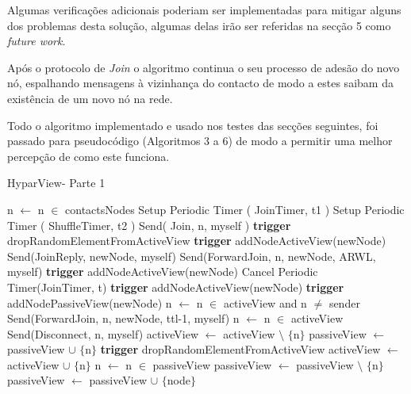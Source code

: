 Algumas verificações adicionais poderiam ser implementadas para mitigar alguns dos problemas desta solução, algumas delas irão ser referidas na secção 5 como \textit{future work}.

Após o protocolo de \textit{Join} o algoritmo continua o seu processo de adesão do novo nó, espalhando mensagens à vizinhança do contacto de modo a estes saibam da existência de um novo nó na rede.

Todo o algoritmo implementado e usado nos testes das secções seguintes, foi passado para pseudocódigo (Algoritmos 3 a 6) de modo a permitir uma melhor percepção de como este funciona.

\begin{algorithm}
   \caption{HyparView- Parte 1}
    \begin{algorithmic}[1]
        \State n $\leftarrow$ n $\in$ contactsNodes
        \State Setup Periodic Timer ( JoinTimer, t1 )
	    \State Setup Periodic Timer ( ShuffleTimer, t2 )
	    \State Send( Join, n, myself )
	  \EndFunction
	    \State
            \State \textbf{trigger} dropRandomElementFromActiveView
        \EndIf
        \State \textbf{trigger} addNodeActiveView(newNode)
        \State Send(JoinReply, newNode, myself)
            \State Send(ForwardJoin, n, newNode, ARWL, myself)
        \EndFor
     \EndFunction
     \State
        \State \textbf{trigger} addNodeActiveView(newNode)
        \State Cancel Periodic Timer(JoinTimer, t)
     \EndFunction
     \State
            \State \textbf{trigger} addNodeActiveView(newNode)
        \Else
                \State \textbf{trigger} addNodePassiveView(newNode)
            \EndIf
            \State n $\leftarrow$ n $\in$ activeView and n $\ne$ sender
            \State Send(ForwardJoin, n, newNode, ttl-1, myself)
        \EndIf
     \EndFunction
     \State
        \State n $\leftarrow$ n $\in$ activeView
        \State Send(Disconnect, n, myself)
        \State activeView $\leftarrow$ activeView $\setminus$ $\{$n$\}$
        \State passiveView $\leftarrow$ passiveView $\cup$ $\{$n$\}$
     \EndFunction
     \State
                \State \textbf{trigger} dropRandomElementFromActiveView
            \EndIf
            \State activeView $\leftarrow$ activeView $\cup$ $\{$n$\}$
        \EndIf
     \EndFunction
     \State
                \State n $\leftarrow$ n $\in$ passiveView
                \State passiveView $\leftarrow$ passiveView $\setminus$ $\{$n$\}$
            \EndIf
            \State passiveView $\leftarrow$ passiveView $\cup$ $\{$node$\}$
        \EndIf
     \EndFunction
    

\end{algorithmic}
\end{algorithm}
